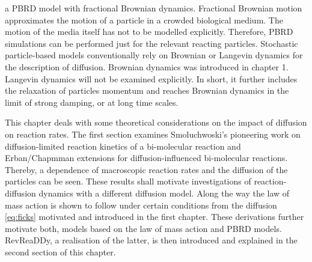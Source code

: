 \documentclass[
  a4paper,BCOR10mm,twoside,
  headsepline,footsepline,%
  fleqn,openbib
]{scrbook}
\begin{document}
a PBRD model with fractional Brownian dynamics. Fractional Brownian motion approximates the motion of a particle in a crowded biological medium. The motion of the media itself has not to be modelled explicitly. Therefore, PBRD simulations can be performed just for the relevant reacting particles. Stochastic particle-based models conventionally rely on Brownian or Langevin dynamics for the description of diffusion. Brownian dynamics was introduced in chapter 1. Langevin dynamics will not be examined explicitly. In short, it further includes the relaxation of particles momentum and reaches Brownian dynamics in the limit of strong damping, or at long time scales.\par
This chapter deals with some theoretical considerations on the impact of diffusion on reaction rates. The first section examines Smoluchwoski's pioneering work \cite{Smoluchowski1} on diffusion-limited reaction kinetics of a bi-molecular reaction and Erban/Chapmman extensions \cite{Erban2009} for diffusion-influenced bi-molecular reactions. Thereby, a dependence of macroscopic reaction rates and the diffusion of the particles can be seen. These results shall motivate investigations of reaction-diffusion dynamics with a different diffusion model. Along the way the law of mass action is shown to follow under certain conditions from the diffusion \cref{eq:ficks} motivated and introduced in the first chapter. These derivations further motivate both, models based on the law of mass action and PBRD models. RevReaDDy, a realisation of the latter, is then introduced and explained in the second section of this chapter.
\end{document}
